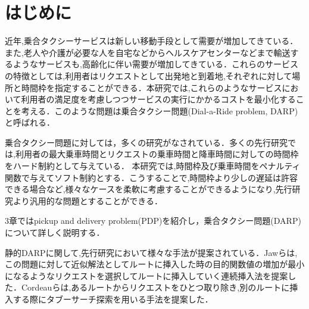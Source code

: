 \chapter{はじめに}
近年,乗合タクシーサービスは新しい移動手段として需要が増加してきている．また,老人や介護が必要な人を自宅などからヘルスケアセンターなどまで輸送するようなサービスも,高齢化に伴い需要が増加してきている．これらのサービスの特徴としては,利用者はリクエストとして出発地と到着地,それぞれに対して場所と時間枠を指定することができる．本研究では,これらのようなサービスにおいて利用者の満足度を考慮しつつサービスの実行にかかるコストを最小化することを考える．このような問題は乗合タクシー問題(Dial-a-Ride problem, DARP)と呼ばれる．

乗合タクシー問題に対しては，多くの研究がなされている．多くの先行研究では,利用者の最大乗車時間とリクエストの乗車時間と降車時間に対しての時間枠をハード制約として与えている．
本研究では,時間枠及び乗車時間をペナルティ関数で与えてソフト制約とする．こうすることで,時間枠より少しの遅延は許容できる場合など,様々なケースを柔軟に考慮することができるようになり,先行研究より汎用的な問題とすることができる．

3章ではpickup and delivery problem(PDP)を紹介し，乗合タクシー問題(DARP)について詳しく説明する．

静的DARPに関して,先行研究において様々な手法が提案されている．Jawらは,この問題に対して近似解法としてルートに挿入した時の目的関数値の増加が最小になるようなリクエストを選択してルートに挿入していく連続挿入法を提案した\cite{insertion}．Cordeauらは,あるルートからリクエストをひとつ取り除き,別のルートに挿入する際にタブーサーチ探索を用いる手法を提案した\cite{tabu}．
